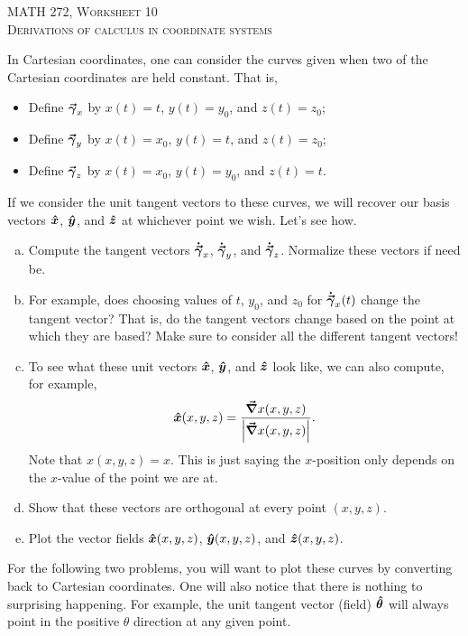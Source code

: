 \documentclass[12pt]{article} %
\begin{document}
\begin{center}
   \textsc{\large MATH 272, Worksheet 10}\\
   \textsc{Derivations of calculus in coordinate systems}
\end{center}
\vspace{.5cm}

\vspace*{1cm}
\begin{problem}
In Cartesian coordinates, one can consider the curves given when two of the Cartesian coordinates are held constant. That is,
\begin{itemize}
    \item Define $\boldsymbol{\vec{\gamma}}_x$ by $x(t)=t$, $y(t)=y_0$, and $z(t)=z_0$;
    \item Define $\boldsymbol{\vec{\gamma}}_y$ by $x(t)=x_0$, $y(t)=t$, and $z(t)=z_0$;
    \item Define $\boldsymbol{\vec{\gamma}}_z$ by $x(t)=x_0$, $y(t)=y_0$, and $z(t)=t$.
\end{itemize}
If we consider the unit tangent vectors to these curves, we will recover our basis vectors $\boldsymbol{\hat{x}}$, $\boldsymbol{\hat{y}}$, and $\boldsymbol{\hat{z}}$ at whichever point we wish.  Let's see how.
\begin{enumerate}[(a)]
    \item Compute the tangent vectors $\boldsymbol{\dot{\vec{\gamma}}}_x$, $\boldsymbol{\dot{\vec{\gamma}}}_y$, and $\boldsymbol{\dot{\vec{\gamma}}}_z$.  Normalize these vectors if need be.
    \item For example, does choosing values of $t$, $y_0$, and $z_0$ for $\boldsymbol{\dot{\vec{\gamma}}}_x(t)$ change the tangent vector? That is, do the tangent vectors change based on the point at which they are based? Make sure to consider all the different tangent vectors!
    \item To see what these unit vectors $\boldsymbol{\hat{x}}$, $\boldsymbol{\hat{y}}$, and $\boldsymbol{\hat{z}}$ look like, we can also compute, for example,
        \[
        \boldsymbol{\hat{x}}(x,y,z) = \frac{\boldsymbol{\vec{\nabla}} x(x,y,z)}{\left| \boldsymbol{\vec{\nabla}} x(x,y,z)\right|}.
        \]
        Note that $x(x,y,z)=x$. This is just saying the $x$-position only depends on the $x$-value of the point we are at.
    \item Show that these vectors are orthogonal at every point $(x,y,z)$.
    \item Plot the vector fields $\boldsymbol{\hat{x}}(x,y,z)$, $\boldsymbol{\hat{y}}(x,y,z)$, and $\boldsymbol{\hat{z}}(x,y,z)$.
\end{enumerate}
\end{problem}

\vspace*{1cm}
\begin{center}
For the following two problems, you will want to plot these curves by converting back to Cartesian coordinates.  One will also notice that there is nothing to surprising happening.  For example, the unit tangent vector (field) $\boldsymbol{\boldsymbol{\hat{\theta}}}$ will always point in the positive $\theta$ direction at any given point.
\end{center}
\end{document}
